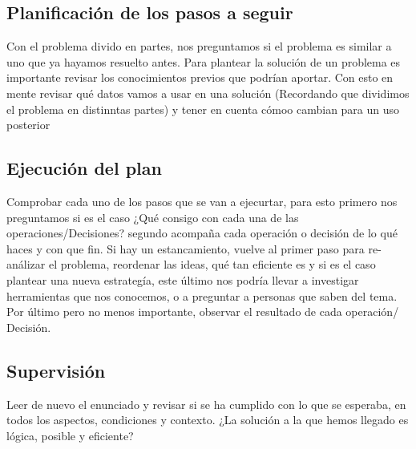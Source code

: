\documentclass{article}
\begin{document}
\subsection{Planificación de los pasos a seguir}
Con el problema divido en partes, nos preguntamos si el problema es similar a uno que ya hayamos resuelto antes. Para plantear la solución de un problema es importante revisar los conocimientos previos que podrían aportar. Con esto en mente revisar qué datos vamos a usar en una solución (Recordando que dividimos el problema en distinntas partes) y tener en cuenta cómoo cambian para un uso posterior
\subsection{Ejecución del plan}
Comprobar cada uno de los pasos que se van a ejecurtar, para esto primero nos preguntamos si es el caso ¿Qué consigo con cada una de las operaciones/Decisiones? segundo acompaña cada operación o decisión de lo qué haces y con que fin. Si hay un  estancamiento, vuelve al primer paso para re-análizar el problema, reordenar las ideas, qué tan eficiente es y si es el caso plantear una nueva estrategía, este último nos podría llevar a investigar herramientas que nos conocemos, o a preguntar a personas que saben del tema.
Por último pero no menos importante, observar el resultado de cada operación/ Decisión.

\subsection{Supervisión}
Leer de nuevo el enunciado y revisar si se ha cumplido con lo que se esperaba, en todos los aspectos, condiciones y contexto. 
¿La solución a la que hemos llegado es lógica, posible y eficiente?



\end{document}
